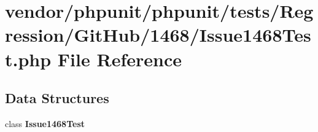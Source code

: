 \section{vendor/phpunit/phpunit/tests/\+Regression/\+Git\+Hub/1468/\+Issue1468\+Test.php File Reference}
\label{_issue1468_test_8php}
\subsection*{Data Structures}
\begin{DoxyCompactItemize}
\item 
class {\bf Issue1468\+Test}
\end{DoxyCompactItemize}
